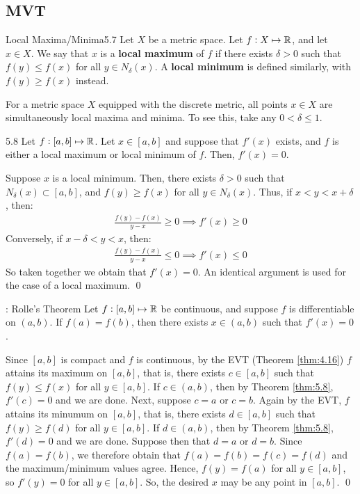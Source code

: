 \subsection{MVT}

\setcounter{rudin}{6}
\begin{definition}{Local Maxima/Minima}{5.7}
    Let $X$ be a metric space. Let $f: X \mapsto \mathbb{R}$, and let $x \in X$. We say that $x$ is a \textbf{local maximum} of $f$ if there exists $\delta > 0$ such that $f(y) \leq f(x)$ for all $y \in N_{\delta}(x)$. A \textbf{local minimum} is defined similarly, with $f(y) \geq f(x)$ instead.
\end{definition}
\noindent For a metric space $X$ equipped with the discrete metric, all points $x \in X$ are simultaneously local maxima and minima. To see this, take any $0 < \delta \leq 1$. 

\begin{theorem}{}{5.8}
    Let $f: [a, b] \mapsto \mathbb{R}$. Let $x \in [a, b]$ and suppose that $f'(x)$ exists, and $f$ is either a local maximum or local minimum of $f$. Then, $f'(x) = 0$. 
\end{theorem}
\begin{nproof}
    Suppose $x$ is a local minimum. Then, there exists $\delta > 0$ such that $N_{\delta}(x) \subset [a, b]$, and $f(y) \geq f(x)$ for all $y \in N_{\delta}(x)$. Thus, if $x < y < x + \delta$, then:
    \begin{align*}
        \frac{f(y) - f(x)}{y - x} \geq 0 \implies f'(x) \geq 0
    \end{align*}
    Conversely, if $x - \delta < y < x$, then:
    \begin{align*}
        \frac{f(y) - f(x)}{y - x} \leq 0 \implies f'(x) \leq 0
    \end{align*}
    So taken together we obtain that $f'(x) = 0$. An identical argument is used for the case of a local maximum. \qed
\end{nproof}

\begin{ntheorem}{: Rolle's Theorem}{}
    Let $f: [a, b] \mapsto \mathbb{R}$ be continuous, and suppose $f$ is differentiable on $(a, b)$. If $f(a) = f(b)$, then there exists $x \in (a, b)$ such that $f'(x) = 0$.
\end{ntheorem}
\begin{nproof}
    Since $[a, b]$ is compact and $f$ is continuous, by the EVT (Theorem \ref{thm:4.16}) $f$ attains its maximum on $[a, b]$, that is, there exists $c \in [a, b]$ such that $f(y) \leq f(x)$ for all $y \in [a, b]$. If $c \in (a, b)$, then by Theorem \ref{thm:5.8}, $f'(c) = 0$ and we are done. Next, suppose $c = a$ or $c = b$. Again by the EVT, $f$ attains its minumum on $[a, b]$, that is, there exists $d \in [a, b]$ such that $f(y) \geq f(d)$ for all $y \in [a, b]$. If $d \in (a, b)$, then by Theorem \ref{thm:5.8}, $f'(d) = 0$ and we are done. Suppose then that $d = a$ or $d = b$. Since $f(a) = f(b)$, we therefore obtain that $f(a) = f(b) = f(c) = f(d)$ and the maximum/minimum values agree. Hence, $f(y) = f(a)$ for all $y \in [a, b]$, so $f'(y) = 0$ for all $y \in [a, b]$. So, the desired $x$ may be any point in $[a, b]$. \qed
\end{nproof}

